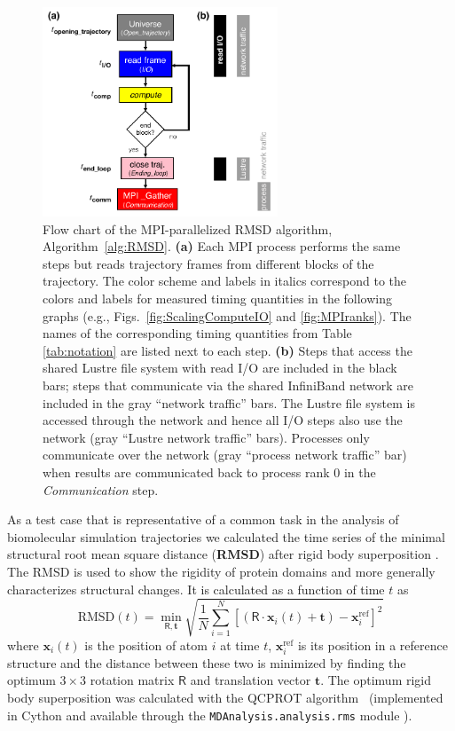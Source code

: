 \begin{figure}[!htb]
  \centering
  \includegraphics[width=7cm]{figures/flowchart.pdf}
  \caption{Flow chart of the MPI-parallelized RMSD algorithm, Algorithm~\ref{alg:RMSD}.
    \textbf{(a)} Each MPI process performs the same steps but reads trajectory frames from different blocks of the trajectory.
    The color scheme and labels in italics correspond to the colors and labels for measured timing quantities in the following graphs (e.g., Figs.~\protect\ref{fig:ScalingComputeIO} and \protect\ref{fig:MPIranks}).
    The names of the corresponding timing quantities from Table \protect\ref{tab:notation} are listed next to each step.
    \textbf{(b)} Steps that access the shared Lustre file system with read I/O are included in the black bars; steps that communicate via the shared InfiniBand network are included in the gray ``network traffic'' bars.
    The Lustre file system is accessed through the network and hence all I/O steps also use the network (gray ``Lustre network traffic'' bars).
    Processes only communicate over the network (gray ``process network traffic'' bar) when results are communicated back to process rank 0 in the \emph{Communication} step.
  }
  \label{fig:flowchart}
\end{figure}

As a test case that is representative of a common task in the analysis of biomolecular simulation trajectories we calculated the time series of the minimal structural root mean square distance  (\textbf{RMSD}) after rigid body superposition \cite{Lea96, Mura:2014kx}.
The RMSD is used to show the rigidity of protein domains and more generally characterizes structural changes.
It is calculated as a function of time $t$ as
\begin{equation}
  \label{eq:rmsd}
  \text{RMSD}(t) = \min_{\mathsf{R}, \mathbf{t}} %
  \sqrt{\frac{1}{N} \sum_{i=1}^{N} \left[ %
      (\mathsf{R}\cdot\mathbf{x}_{i}(t) + \mathbf{t}) - \mathbf{x}_{i}^{\text{ref}} \right]^{2}}
\end{equation}
where $\mathbf{x}_{i}(t)$ is the position of atom $i$ at time $t$, $\mathbf{x}_{i}^{\text{ref}}$ is its position in a reference structure and the distance between these two is minimized by finding the optimum $3\times3$ rotation matrix $\mathsf{R}$ and translation vector $\mathbf{t}$. 
The optimum rigid body superposition was calculated with the QCPROT algorithm~\cite{Liu:2010kx,Theobald:2005vn} (implemented in Cython and available through the \texttt{MDAnalysis.analysis.rms} module \cite{Gowers:2016aa}).

